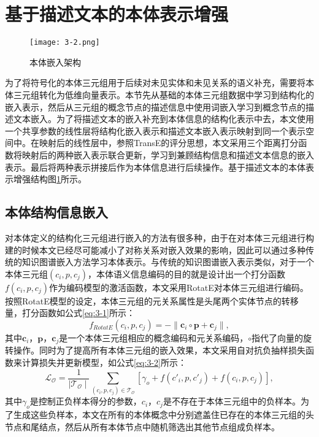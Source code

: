 \section{基于描述文本的本体表示增强}
\begin{figure}[!b]
  \centering
  \texttt{[image: 3-2.png]}
  \caption{本体嵌入架构}
  \label{fig:3-6}
\end{figure}

为了将符号化的本体三元组用于后续对未见实体和未见关系的语义补充，需要将本体三元组转化为低维向量表示。本节先从基础的本体三元组数据中学习到结构化的嵌入表示，然后从三元组的概念节点的描述信息中使用词嵌入学习到概念节点的描述文本嵌入。为了将描述文本的嵌入补充到本体信息的结构化表示中去，本文使用一个共享参数的线性层将结构化嵌入表示和描述文本嵌入表示映射到同一个表示空间中。在映射后的线性层中，参照TransE的评分思想，本文采用三个距离打分函数将映射后的两种嵌入表示联合更新，学习到兼顾结构信息和描述文本信息的嵌入表示。最后将两种表示拼接后作为本体信息进行后续操作。基于描述文本的本体表示增强结构图\ref{fig:3-6}所示。

\subsection{本体结构信息嵌入}
对本体定义的结构化三元组进行嵌入的方法有很多种，由于在对本体三元组进行构建的时候本文已经尽可能减小了对称关系对嵌入效果的影响，因此可以通过多种传统的知识图谱嵌入方法学习本体表示。与传统的知识图谱嵌入表示类似，对于一个本体三元组\((c_{i},p,c_{j})\)，本体语义信息编码的目的就是设计出一个打分函数\(f(c_{i},p,c_{j})\)作为编码模型的激活函数，本文采用RotatE对本体三元组进行编码。按照RotatE模型的设定，本体三元组的元关系属性是头尾两个实体节点的转移量，打分函数如公式\ref{eq:3-1}所示：
\begin{equation}
  f_{RotatE}(c_{i},p,c_{j}) = - \| \textbf{c}_{i} \circ \textbf{p} + \textbf{c}_{j}\|, \label{eq:3-1}
\end{equation}
其中\(\textbf{c}_{i}\)，\(\textbf{p}\)，\(\textbf{c}_{j}\)是一个本体三元组相应的概念编码和元关系编码，\(\circ\)指代了向量的旋转操作。同时为了提高所有本体三元组的嵌入效果，本文采用自对抗负抽样损失函数来计算损失并更新模型，如公式\ref{eq:3-2}所示：
\begin{equation}
  \mathcal{L}_{\mathcal{O}} = \frac{1}{\mid \mathcal{T}_{\mathcal{O}}\mid} \sum_{(c_{i},p,c_{j}) \in \mathcal{T}_{\mathcal{O}}} [\gamma _{o} + f(c'_{i},p,c'_{j}) + f(c_{i},p,c_{j})], \label{eq:3-2}
\end{equation}
其中\(\gamma _{o}\)是控制正负样本得分的参数，\(c_{i}\)，\(c_{j}\)是不存在于本体三元组中的负样本。为了生成这些负样本，本文在所有的本体概念中分别遮盖住已存在的本体三元组的头节点和尾结点，然后从所有本体节点中随机筛选出其他节点组成负样本。

